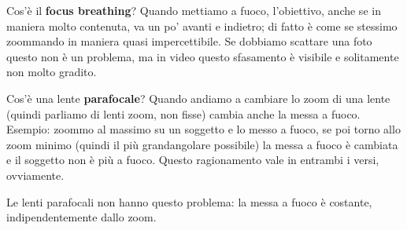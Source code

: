 Cos'è il \textbf{focus breathing}?
Quando mettiamo a fuoco, l'obiettivo, anche se in maniera molto contenuta, va un po' avanti e indietro; di fatto è come se stessimo zoommando in maniera quasi impercettibile.
Se dobbiamo scattare una foto questo non è un problema, ma in video questo sfasamento è visibile e solitamente non molto gradito.

Cos'è una lente \textbf{parafocale}?
Quando andiamo a cambiare lo zoom di una lente (quindi parliamo di lenti zoom, non fisse) cambia anche la messa a fuoco.
Esempio: zoommo al massimo su un soggetto e lo messo a fuoco, se poi torno allo zoom minimo (quindi il più grandangolare possibile) la messa a fuoco è cambiata e il soggetto non è più a fuoco.
Questo ragionamento vale in entrambi i versi, ovviamente.

Le lenti parafocali non hanno questo problema: la messa a fuoco è costante, indipendentemente dallo zoom.